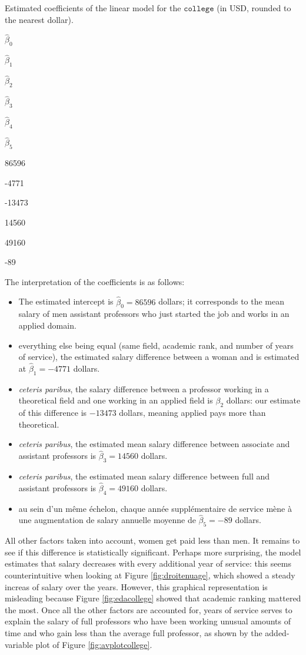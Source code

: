 \documentclass[
  11pt,
  letterpaper,
]{book}
\providecommand{\tightlist}{%
  \setlength{\itemsep}{0pt}\setlength{\parskip}{0pt}}
\theoremstyle{definition}
\theoremstyle{definition}
\theoremstyle{definition}
\theoremstyle{remark}
\begin{document}
\label{tab:collegecoefs}Estimated coefficients of the linear model for the \(\texttt{college}\) (in USD, rounded to the nearest dollar).

\(\widehat{\beta}_0\)

\(\widehat{\beta}_1\)

\(\widehat{\beta}_2\)

\(\widehat{\beta}_3\)

\(\widehat{\beta}_4\)

\(\widehat{\beta}_5\)

86596

-4771

-13473

14560

49160

-89

The interpretation of the coefficients is as follows:

\begin{itemize}
\tightlist
\item
  The estimated intercept is \(\widehat{\beta}_0=86596\) dollars; it corresponds to the mean salary of men assistant professors who just started the job and works in an applied domain.
\item
  everything else being equal (same field, academic rank, and number of years of service), the estimated salary difference between a woman and is estimated at \(\widehat{\beta}_1=-4771\) dollars.
\item
  \emph{ceteris paribus}, the salary difference between a professor working in a theoretical field and one working in an applied field is \(\beta_2\) dollars: our estimate of this difference is \(-13473\) dollars, meaning applied pays more than theoretical.
\item
  \emph{ceteris paribus}, the estimated mean salary difference between associate and assistant professors is \(\widehat{\beta}_3=14560\) dollars.
\item
  \emph{ceteris paribus}, the estimated mean salary difference between full and assistant professors is \(\widehat{\beta}_4=49160\) dollars.
\item
  au sein d'un même échelon, chaque année supplémentaire de service mène à une augmentation de salary annuelle moyenne de \(\widehat{\beta}_5=-89\) dollars.
\end{itemize}

All other factors taken into account, women get paid less than men. It remains to see if this difference is statistically significant. Perhaps more surprising, the model estimates that salary decreases with every additional year of service: this seems counterintuitive when looking at Figure \ref{fig:droitenuage}, which showed a steady increas of salary over the years. However, this graphical representation is misleading because Figure \ref{fig:edacollege} showed that academic ranking mattered the most. Once all the other factors are accounted for, years of service serves to explain the salary of full professors who have been working unusual amounts of time and who gain less than the average full professor, as shown by the added-variable plot of Figure \ref{fig:avplotcollege}.
\end{document}
